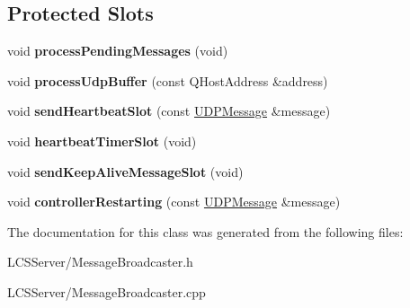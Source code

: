 \subsection*{Protected Slots}
\begin{DoxyCompactItemize}
\item 
\mbox{\label{class_message_broadcaster_a699e964a4d64025b5d31387a7e1e4db9}} 
void {\bfseries process\+Pending\+Messages} (void)
\item 
\mbox{\label{class_message_broadcaster_a2e51c2d01ad3b6849f7ea653b2ab0d76}} 
void {\bfseries process\+Udp\+Buffer} (const Q\+Host\+Address \&address)
\item 
\mbox{\label{class_message_broadcaster_af4784fce7b71681f321bda9c953db63b}} 
void {\bfseries send\+Heartbeat\+Slot} (const \hyperlink{class_u_d_p_message}{U\+D\+P\+Message} \&message)
\item 
\mbox{\label{class_message_broadcaster_a9d7639d045a65534a99fcf7621681688}} 
void {\bfseries heartbeat\+Timer\+Slot} (void)
\item 
\mbox{\label{class_message_broadcaster_ae138b05340d5f3536668a674cdca0d01}} 
void {\bfseries send\+Keep\+Alive\+Message\+Slot} (void)
\item 
\mbox{\label{class_message_broadcaster_a54843b46cff4ac2a53c5f25ecf428443}} 
void {\bfseries controller\+Restarting} (const \hyperlink{class_u_d_p_message}{U\+D\+P\+Message} \&message)
\end{DoxyCompactItemize}


The documentation for this class was generated from the following files\+:\begin{DoxyCompactItemize}
\item 
L\+C\+S\+Server/Message\+Broadcaster.\+h\item 
L\+C\+S\+Server/Message\+Broadcaster.\+cpp\end{DoxyCompactItemize}
